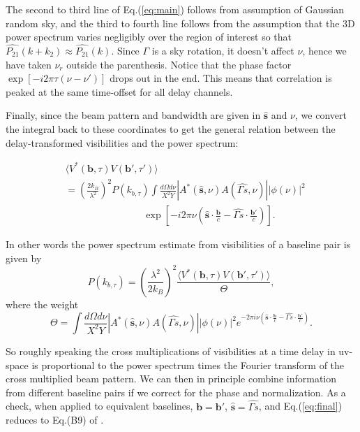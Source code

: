 \documentclass[preprint2,numberedappendix,tighten,twocolappendix]{aastex6}  %
\renewcommand\[{\begin{equation}}
\renewcommand\]{\end{equation}}
\begin{document}
The second to third line of Eq.(\ref{eq:main}) follows from assumption of Gaussian random
sky, and the third to fourth line follows from the assumption that
the 3D power spectrum varies negligibly over the region of interest
so that $\hat{P_{21}}(k+k_{2})\approx\hat{P_{21}}(k)$. Since $\Gamma$
is a sky rotation, it doesn't affect $\nu$, hence we have taken $\nu_{r}$
outside the parenthesis. Notice that the phase factor $\exp\left[-i2\pi\tau\left(\nu-\nu'\right)\right]$
drops out in the end. This means that correlation is peaked at the same time-offset for all delay channels. 

Finally, since the beam pattern and bandwidth are given in $\hat{\boldsymbol{s}}$
and $\nu$, we convert the integral back to these coordinates to get
the general relation between the delay-transformed visibilities and
the power spectrum:

\begin{equation}
\begin{aligned} & \langle V^{*}(\boldsymbol{b},\tau)V(\boldsymbol{b'},\tau')\rangle\\
 & =\left(\frac{2k_{B}}{\lambda^{2}}\right)^{2}P(k_{b,\tau})\int\frac{d\Omega d\nu}{X^{2}Y}|A^{*}(\hat{\boldsymbol{s}},\nu)A(\hat{\Gamma s},\nu)||\phi(\nu)|^{2}\\
 & \qquad \qquad \qquad \qquad \exp\left[-i2\pi\nu\left(\hat{\boldsymbol{s}}\cdot\frac{\boldsymbol{b}}{c}-\hat{\Gamma s}\cdot\frac{\boldsymbol{b'}}{c}\right)\right].\end{aligned}
\label{eq:final}
\end{equation}

In other words the power spectrum estimate from visibilities of a baseline pair is given by 
\begin{equation}
 P(k_{b,\tau}) = \left(\frac{\lambda^{2}}{2k_{B}}\right)^{2} \frac{\langle V^{*}(\boldsymbol{b},\tau)V(\boldsymbol{b'},\tau')\rangle}{\Theta}, 
\end{equation}
where the weight
\begin{equation}
\Theta =\int\frac{d\Omega d\nu}{X^{2}Y}|A^{*}(\hat{\boldsymbol{s}},\nu)A(\hat{\Gamma s},\nu)||\phi(\nu)|^{2} e^{-2\pi i\nu\left(\hat{\boldsymbol{s}}\cdot\frac{\boldsymbol{b}}{c}-\hat{\Gamma s}\cdot\frac{\boldsymbol{b'}}{c}\right)}. 
\label{eq:opp}
\end{equation}



So roughly speaking the cross multiplications of visibilities at a time delay
in uv-space is proportional to the power spectrum times the Fourier
transform of the cross multiplied beam pattern. We can then in principle
combine information from different baseline pairs if we correct for
the phase and normalization. As a check, when applied to equivalent baselines,
$\boldsymbol{b}=\boldsymbol{b'}$, $\hat{\boldsymbol{s}}=\hat{\Gamma s}$, and Eq.(\ref{eq:final}) reduces to Eq.(B9) of \cite{paper32}. 
\end{document}

